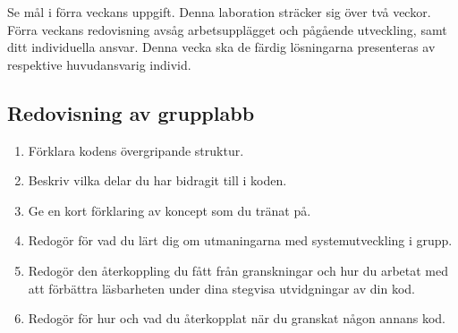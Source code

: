 
\Lab{\LabWeekELEVEN}

\begin{Goals}
\item Se mål i förra veckans uppgift. Denna laboration sträcker sig över två veckor. Förra veckans redovisning avsåg arbetsupplägget och pågående utveckling, samt ditt individuella ansvar. Denna vecka ska de färdig lösningarna presenteras av respektive huvudansvarig individ. 
\end{Goals}

\begin{Preparations}
\item {}
\end{Preparations}

\subsection{Redovisning av grupplabb}

\begin{enumerate}
\item Förklara kodens övergripande struktur.
\item Beskriv vilka delar du har bidragit till i koden.
\item Ge en kort förklaring av koncept som du tränat på.
\item Redogör för vad du lärt dig om utmaningarna med systemutveckling i grupp.
\item Redogör den återkoppling du fått från granskningar och hur du arbetat med att förbättra läsbarheten under dina stegvisa utvidgningar av din kod.
\item Redogör för hur och vad du återkopplat när du granskat någon annans kod.
\end{enumerate}

